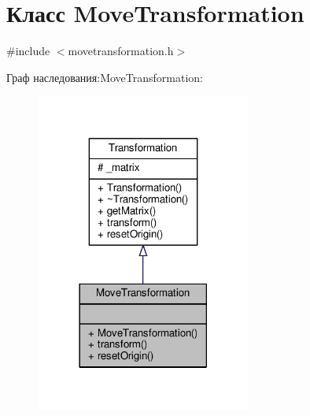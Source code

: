 \hypertarget{class_move_transformation}{}\section{Класс Move\+Transformation}
\label{class_move_transformation}


{\ttfamily \#include $<$movetransformation.\+h$>$}



Граф наследования\+:Move\+Transformation\+:
\nopagebreak
\begin{figure}[H]
\begin{center}
\leavevmode
\includegraphics[width=201pt]{d5/d58/class_move_transformation__inherit__graph}
\end{center}
\end{figure}


